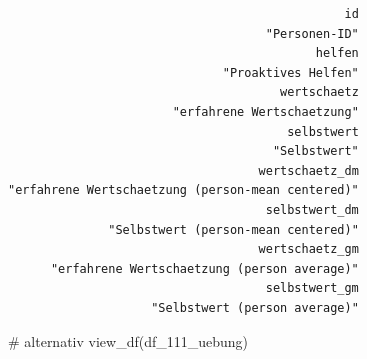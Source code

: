 \documentclass[
  letterpaper,
  DIV=11,
  numbers=noendperiod]{scrreprt}
\newenvironment{Shaded}{\begin{snugshade}}{\end{snugshade}}
\newcommand{\CommentTok}[1]{\textcolor[rgb]{0.37,0.37,0.37}{#1}}
\newcommand{\FunctionTok}[1]{\textcolor[rgb]{0.28,0.35,0.67}{#1}}
\newcommand{\NormalTok}[1]{\textcolor[rgb]{0.00,0.23,0.31}{#1}}
\begin{document}
\begin{verbatim}
                                               id 
                                    "Personen-ID" 
                                           helfen 
                              "Proaktives Helfen" 
                                      wertschaetz 
                       "erfahrene Wertschaetzung" 
                                       selbstwert 
                                     "Selbstwert" 
                                   wertschaetz_dm 
"erfahrene Wertschaetzung (person-mean centered)" 
                                    selbstwert_dm 
              "Selbstwert (person-mean centered)" 
                                   wertschaetz_gm 
      "erfahrene Wertschaetzung (person average)" 
                                    selbstwert_gm 
                    "Selbstwert (person average)" 
\end{verbatim}

\begin{Shaded}
\begin{Highlighting}[]
\CommentTok{\# alternativ}
\FunctionTok{view\_df}\NormalTok{(df\_111\_uebung)}
\end{Highlighting}
\end{Shaded}
\end{document}
